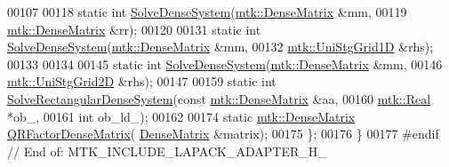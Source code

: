 \begin{DoxyCode}
00107 
00118   \textcolor{keyword}{static} \textcolor{keywordtype}{int} \hyperlink{classmtk_1_1LAPACKAdapter_a7428bccf74fd4a4af68fb7233846da22}{SolveDenseSystem}(\hyperlink{classmtk_1_1DenseMatrix}{mtk::DenseMatrix} &mm,
00119                               \hyperlink{classmtk_1_1DenseMatrix}{mtk::DenseMatrix} &rr);
00120 
00131   \textcolor{keyword}{static} \textcolor{keywordtype}{int} \hyperlink{classmtk_1_1LAPACKAdapter_a7428bccf74fd4a4af68fb7233846da22}{SolveDenseSystem}(\hyperlink{classmtk_1_1DenseMatrix}{mtk::DenseMatrix} &mm,
00132                               \hyperlink{classmtk_1_1UniStgGrid1D}{mtk::UniStgGrid1D} &rhs);
00133 
00134 
00145   \textcolor{keyword}{static} \textcolor{keywordtype}{int} \hyperlink{classmtk_1_1LAPACKAdapter_a7428bccf74fd4a4af68fb7233846da22}{SolveDenseSystem}(\hyperlink{classmtk_1_1DenseMatrix}{mtk::DenseMatrix} &mm,
00146                               \hyperlink{classmtk_1_1UniStgGrid2D}{mtk::UniStgGrid2D} &rhs);
00147 
00159   \textcolor{keyword}{static} \textcolor{keywordtype}{int} \hyperlink{classmtk_1_1LAPACKAdapter_a380f148ffdf96bae2f79ae28f1a6560c}{SolveRectangularDenseSystem}(\textcolor{keyword}{const} 
      \hyperlink{classmtk_1_1DenseMatrix}{mtk::DenseMatrix} &aa,
00160                                          \hyperlink{group__c01-roots_gac080bbbf5cbb5502c9f00405f894857d}{mtk::Real} *ob\_,
00161                                          \textcolor{keywordtype}{int} ob\_ld\_);
00162 
00174   \textcolor{keyword}{static} \hyperlink{classmtk_1_1DenseMatrix}{mtk::DenseMatrix} \hyperlink{classmtk_1_1LAPACKAdapter_ae5c6e78c9c819c9ac7a6f31bfd011d7a}{QRFactorDenseMatrix}(
      \hyperlink{classmtk_1_1DenseMatrix}{DenseMatrix} &matrix);
00175 \};
00176 \}
00177 \textcolor{preprocessor}{#endif  // End of: MTK\_INCLUDE\_LAPACK\_ADAPTER\_H\_}
\end{DoxyCode}

